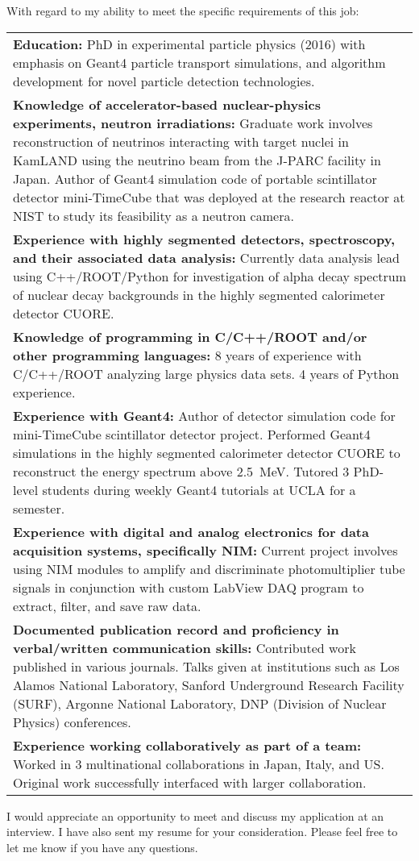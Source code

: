 \documentclass[11pt]{moderncv}        %
\begin{document}
With regard to my ability to meet the specific requirements of this job:\\
\noindent\begin{tabularx}{\linewidth}{@{{}\textbullet\enskip}X@{\quad}@{}}
	\textbf{Education:} PhD in experimental particle physics (2016) with
	emphasis on Geant4 particle transport simulations, and algorithm
	development for novel particle detection technologies.\\
	\textbf{Knowledge of accelerator-based nuclear-physics experiments, neutron
	irradiations:}
	Graduate work involves reconstruction of neutrinos interacting with target
	nuclei in KamLAND using the neutrino beam from the J-PARC facility in
	Japan. Author of Geant4 simulation code of portable scintillator detector
	mini-TimeCube that was deployed at the research reactor at NIST to study
	its feasibility as a neutron camera.\\
	\textbf{Experience with highly segmented detectors, spectroscopy, and their
	associated data analysis:} Currently data analysis lead using
	C++/ROOT/Python for investigation of alpha decay spectrum of nuclear decay
	backgrounds in the highly segmented calorimeter detector CUORE.\\
	\textbf{Knowledge of programming in C/C++/ROOT and/or other programming
	languages:} 8 years of experience with C/C++/ROOT analyzing large
	physics data sets. 4 years of Python experience.\\
	\textbf{Experience with Geant4:} Author of detector simulation code for
	mini-TimeCube scintillator detector project. Performed Geant4 simulations
	in the highly segmented calorimeter detector CUORE to reconstruct the
	energy spectrum above \SI{2.5}{MeV}. Tutored 3 PhD-level students during
	weekly Geant4 tutorials at UCLA for a semester.\\
	\textbf{Experience with digital and analog electronics for data acquisition
	systems, specifically NIM:} Current project involves using NIM modules to
	amplify and discriminate photomultiplier tube signals in conjunction with
	custom LabView DAQ program to extract, filter, and save raw data.\\
	\textbf{Documented publication record and proficiency in verbal/written
	communication skills:} 
	Contributed work published in various journals. Talks given at institutions
	such as Los Alamos National Laboratory, Sanford Underground Research
	Facility (SURF), Argonne National Laboratory, DNP (Division of Nuclear
	Physics) conferences.\\
	\textbf{Experience working collaboratively as part of a team:}
	Worked in 3 multinational collaborations in Japan, Italy, and US. Original
	work successfully interfaced with larger collaboration.\\
\end{tabularx}

I would appreciate an opportunity to meet and discuss my application at an
interview. I have also sent my resume for your consideration. Please feel free
to let me know if you have any questions.

\makeletterclosing
\end{document}
